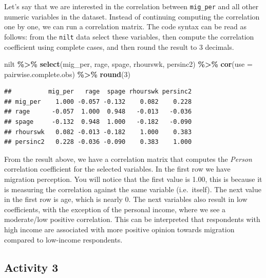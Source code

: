 \documentclass[
]{book}
\newenvironment{Shaded}{\begin{snugshade}}{\end{snugshade}}
\newcommand{\AttributeTok}[1]{\textcolor[rgb]{0.13,0.29,0.53}{#1}}
\newcommand{\DecValTok}[1]{\textcolor[rgb]{0.00,0.00,0.81}{#1}}
\newcommand{\FunctionTok}[1]{\textcolor[rgb]{0.13,0.29,0.53}{\textbf{#1}}}
\newcommand{\NormalTok}[1]{#1}
\newcommand{\SpecialCharTok}[1]{\textcolor[rgb]{0.81,0.36,0.00}{\textbf{#1}}}
\newcommand{\StringTok}[1]{\textcolor[rgb]{0.31,0.60,0.02}{#1}}
\begin{document}
Let's say that we are interested in the correlation between \texttt{mig\_per} and all other numeric variables in the dataset. Instead of continuing computing the correlation one by one, we can run a correlation matrix. The code syntax can be read as follows: from the \texttt{nilt} data select these variables, then compute the correlation coefficient using complete cases, and then round the result to 3 decimals.

\begin{Shaded}
\begin{Highlighting}[]
\NormalTok{nilt }\SpecialCharTok{\%\textgreater{}\%} 
  \FunctionTok{select}\NormalTok{(mig\_per, rage, spage, rhourswk, persinc2) }\SpecialCharTok{\%\textgreater{}\%} 
  \FunctionTok{cor}\NormalTok{(}\AttributeTok{use =} \StringTok{\textquotesingle{}pairwise.complete.obs\textquotesingle{}}\NormalTok{) }\SpecialCharTok{\%\textgreater{}\%} 
  \FunctionTok{round}\NormalTok{(}\DecValTok{3}\NormalTok{)}
\end{Highlighting}
\end{Shaded}

\begin{verbatim}
##          mig_per   rage  spage rhourswk persinc2
## mig_per    1.000 -0.057 -0.132    0.082    0.228
## rage      -0.057  1.000  0.948   -0.013   -0.036
## spage     -0.132  0.948  1.000   -0.182   -0.090
## rhourswk   0.082 -0.013 -0.182    1.000    0.383
## persinc2   0.228 -0.036 -0.090    0.383    1.000
\end{verbatim}

From the result above, we have a correlation matrix that computes the \emph{Person} correlation coefficient for the selected variables. In the first row we have migration perception. You will notice that the first value is 1.00, this is because it is measuring the correlation against the same variable (i.e.~itself). The next value in the first row is age, which is nearly 0. The next variables also result in low coefficients, with the exception of the personal income, where we see a moderate/low positive correlation. This can be interpreted that respondents with high income are associated with more positive opinion towards migration compared to low-income respondents.

\hypertarget{activity-3-1}{%
\subsection{Activity 3}\label{activity-3-1}}
\end{document}

